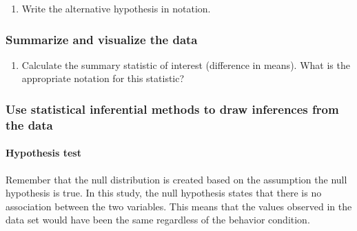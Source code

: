 \documentclass[
]{report}
\providecommand{\tightlist}{%
  \setlength{\itemsep}{0pt}\setlength{\parskip}{0pt}}
\begin{document}
\vspace{1in}

\begin{enumerate}
\def\labelenumi{\arabic{enumi}.}
\setcounter{enumi}{7}
\tightlist
\item
  Write the alternative hypothesis in notation.
\end{enumerate}

\vspace{0.5in}

\hypertarget{summarize-and-visualize-the-data-3}{%
\subsubsection*{Summarize and visualize the data}\label{summarize-and-visualize-the-data-3}}

\begin{enumerate}
\def\labelenumi{\arabic{enumi}.}
\setcounter{enumi}{8}
\tightlist
\item
  Calculate the summary statistic of interest (difference in means). What is the appropriate notation for this statistic?
\end{enumerate}

\vspace{0.5in}

\newpage

\hypertarget{use-statistical-inferential-methods-to-draw-inferences-from-the-data-3}{%
\subsubsection*{Use statistical inferential methods to draw inferences from the data}\label{use-statistical-inferential-methods-to-draw-inferences-from-the-data-3}}

\hypertarget{hypothesis-test-2}{%
\paragraph*{Hypothesis test}\label{hypothesis-test-2}}

Remember that the null distribution is created based on the assumption the null hypothesis is true. In this study, the null hypothesis states that there is no association between the two variables. This means that the values observed in the data set would have been the same regardless of the behavior condition.
\end{document}
